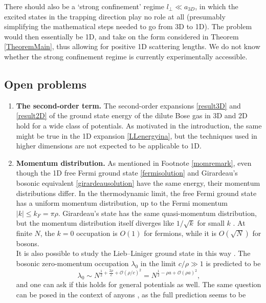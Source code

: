 \documentclass[a4paper,11pt]{article}
\numberwithin{equation}{section}
\begin{document}
There should also be a `strong confinement' regime $l_\perp\ll a_{3D}$, in which the excited states in the trapping direction play no role at all (presumably simplifying the mathematical steps needed to go from 3D to 1D). The problem would then essentially be 1D, and take on the form considered in Theorem \ref{TheoremMain}, thus allowing for positive 1D scattering lengths. We do not know whether the strong confinement regime is currently experimentally accessible. 
\subsection{Open problems}
\label{SecOpenproblems}
\begin{enumerate}
\item \textbf{The second-order term.}
The second-order expansions \eqref{result3D} and \eqref{result2D} of the ground state energy of the dilute Bose gas in 3D and 2D hold for a wide class of potentials. As motivated in the introduction, the same might be true in the 1D expansion \eqref{LLenergyina}, but the techniques used in higher dimensions are not expected to be applicable to 1D. 
\item \textbf{Momentum distribution.}
As mentioned in Footnote \ref{momremark}, even though the 1D free Fermi ground state \eqref{fermisolution} and Girardeau's bosonic equivalent \eqref{girardeausolution} have the same energy, their momentum distributions differ. In the thermodynamic limit, the free Fermi ground state has a uniform momentum distribution, up to the Fermi momentum $|k|\leq k_F=\pi\rho$. Girardeau's state has the same quasi-momentum distribution, but the momentum distribution itself diverges like $1/\sqrt{k}$ for small $k$ \cite{lenard1964momentum,vaidya1979one}. At finite $N$, the $k=0$ occupation is $O(1)$ for fermions, while it is $O(\sqrt{N})$ for bosons.\\
It is also possible to study the Lieb--Liniger ground state in this way \cite{colcelli2018deviations}. The bosonic zero-momentum occupation $\lambda_0$ in the limit $c/\rho\gg1$ is predicted to be 
\begin{equation}
\lambda_0\sim N^{\frac12+\frac{2\rho}{c}+\mathcal{O}(\rho/c)^2}=N^{\frac12-\rho a+\mathcal{O}(\rho a)^2}, 
\end{equation}
and one can ask if this holds for general potentials as well. The same question can be posed in the context of anyons \cite{colcelli2018deviations}, as the full prediction seems to be \cite{colcelli2018deviations,batchelor2006one}
\begin{equation}

\end{equation}
\end{enumerate}
\end{document}

